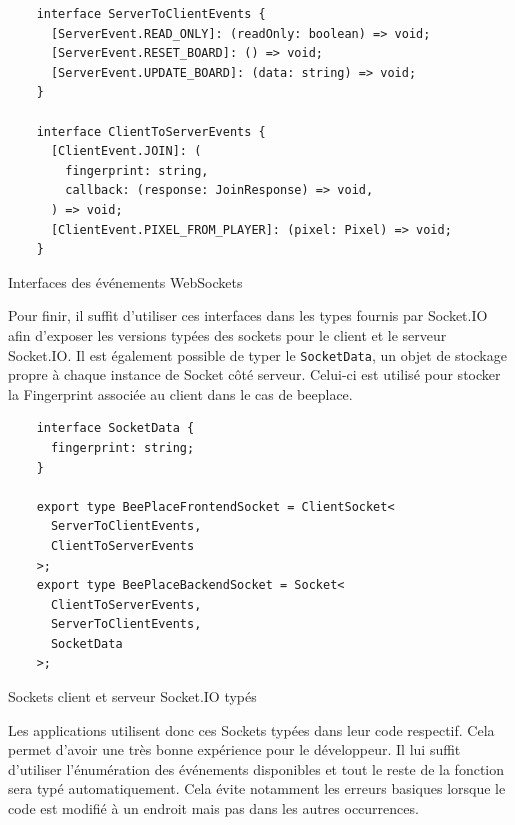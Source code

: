 \begin{listing}[H]
  \begin{verbatim}
    interface ServerToClientEvents {
      [ServerEvent.READ_ONLY]: (readOnly: boolean) => void;
      [ServerEvent.RESET_BOARD]: () => void;
      [ServerEvent.UPDATE_BOARD]: (data: string) => void;
    }

    interface ClientToServerEvents {
      [ClientEvent.JOIN]: (
        fingerprint: string,
        callback: (response: JoinResponse) => void,
      ) => void;
      [ClientEvent.PIXEL_FROM_PLAYER]: (pixel: Pixel) => void;
    }
\end{verbatim}
  \caption{Interfaces des événements WebSockets}
  \label{listing:websockets-events-interfaces}
\end{listing}

Pour finir, il suffit d'utiliser ces interfaces dans les types fournis par Socket.IO afin d'exposer les versions typées des sockets pour le client et le serveur Socket.IO. Il est également possible de typer le \texttt{SocketData}, un objet de stockage propre à chaque instance de Socket côté serveur. Celui-ci est utilisé pour stocker la Fingerprint associée au client dans le cas de \gls{beeplace}.

\begin{listing}[H]
  \begin{verbatim}
    interface SocketData {
      fingerprint: string;
    }

    export type BeePlaceFrontendSocket = ClientSocket<
      ServerToClientEvents,
      ClientToServerEvents
    >;
    export type BeePlaceBackendSocket = Socket<
      ClientToServerEvents,
      ServerToClientEvents,
      SocketData
    >;
\end{verbatim}
  \caption{Sockets client et serveur Socket.IO typés}
  \label{listing:typed-socket-io}
\end{listing}

Les applications utilisent donc ces Sockets typées dans leur code respectif. Cela permet d'avoir une très bonne expérience pour le développeur. Il lui suffit d'utiliser l'énumération des événements disponibles et tout le reste de la fonction sera typé automatiquement. Cela évite notamment les erreurs basiques lorsque le code est modifié à un endroit mais pas dans les autres occurrences.
